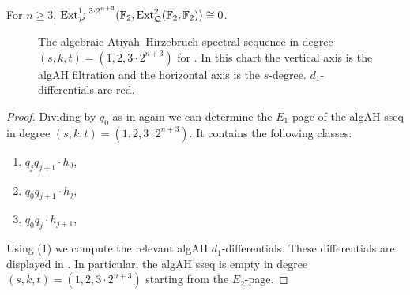 \begin{lem}  \label{lem:skt120}
For $n\geq 3$,  $\operatorname{\mathrm{Ext}}^{1,\ 3\cdot 2^{n+3}}_{\mathcal{P}}(\operatorname{\mathbb{F}}_2, \operatorname{\mathrm{Ext}}_{\mathcal{Q}}^2(\operatorname{\mathbb{F}}_2, \operatorname{\mathbb{F}}_2)) \cong 0$.
\end{lem}

\begin{figure}[h]
\begin{center}
\end{center}
\caption{The algebraic Atiyah--Hirzebruch spectral sequence in degree $(s,k,t) = (1,2, 3\cdot 2^{n+3})$ for . In this chart the vertical axis is the algAH filtration and the horizontal axis is the $s$-degree. $d_1$-differentials are red.}
\label{fig:algA 1-2}
\end{figure}



\begin{proof}
  Dividing by $q_0$ as in  again we can determine
  the $E_1$-page of the algAH sseq in degree $(s,k,t) = (1,2,3 \cdot 2^{n+3})$.
  It contains the following classes:
  \begin{enumerate}
  \item $q_{j}q_{j+1} \cdot h_0$,
  \item $q_0q_{j+1} \cdot h_{j}$,
  \item $q_0q_{j} \cdot h_{j+1}$,
  \end{enumerate}
  Using (1) we compute the relevant algAH $d_1$-differentials.
  These differentials are displayed in .
  In particular, the algAH sseq is empty in degree $(s,k,t) = (1,2,3 \cdot 2^{n+3})$ starting from the $E_2$-page.  
\end{proof}


